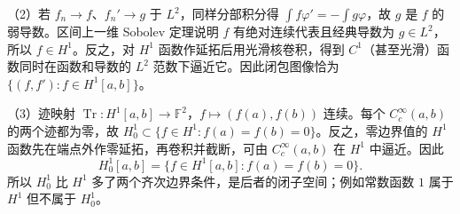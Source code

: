 （2）若 $f_n\to f$、$f_n'\to g$ 于 $L^2$，同样分部积分得
$\int f\varphi'=-\int g\varphi$，故 $g$ 是 $f$ 的弱导数。区间上一维 Sobolev 定理说明 $f$ 有绝对连续代表且经典导数为 $g\in L^2$，所以 $f\in H^1$。反之，对 $H^1$ 函数作延拓后用光滑核卷积，得到 $C^1$（甚至光滑）函数同时在函数和导数的 $L^2$ 范数下逼近它。因此闭包图像恰为
$\{(f,f'):f\in H^1[a,b]\}$。

（3）迹映射 $\operatorname{Tr}:H^1[a,b]\to\mathbb F^2$，$f\mapsto(f(a),f(b))$ 连续。每个
$C_c^\infty(a,b)$ 的两个迹都为零，故
$H_0^1\subset\{f\in H^1:f(a)=f(b)=0\}$。反之，零边界值的 $H^1$ 函数先在端点外作零延拓，再卷积并截断，可由 $C_c^\infty(a,b)$ 在 $H^1$ 中逼近。因此
\[
H_0^1[a,b]=\{f\in H^1[a,b]:f(a)=f(b)=0\}.
\]
所以 $H_0^1$ 比 $H^1$ 多了两个齐次边界条件，是后者的闭子空间；例如常数函数 $1$ 属于 $H^1$ 但不属于 $H_0^1$。

